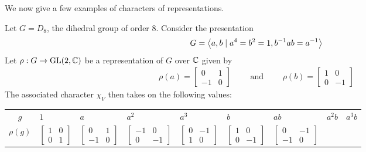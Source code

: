 We now give a few examples of characters of representations.

\begin{example}
    Let $G = D_8$, the dihedral group of order $8$. Consider the presentation
    \begin{align*}
        G = \left\langle a, b \mid a^4 = b^2 = 1, b^{-1} a b = a^{-1} \right\rangle
    \end{align*}
    Let $\rho : G \to \operatorname{GL}\!\left( 2, \mathbb{C} \right)$ be a representation of $G$ over $\mathbb{C}$ given by
    \begin{align*}
        \rho(a) = \begin{bmatrix}
            0 & 1 \\ -1 & 0
        \end{bmatrix}
        \quad\quad \text{ and } \quad\quad
        \rho(b) = \begin{bmatrix}
            1 & 0 \\ 0 & -1
        \end{bmatrix}
    \end{align*}
    The associated character $\chi_V$ then takes on the following values:
    \begin{table}[H]
        \centering
        \begin{tabular}{|c|C{1.2cm} C{1.55cm} C{1.85cm} C{1.55cm} C{1.55cm} C{1.85cm} C{1.55cm} C{1.2cm}|}
            \hline
            $g$ & $1$ & $a$ & $a^2$ & $a^3$ & $b$ & $ab$ & $a^2 b$ & $a^3 b$ \\
            $\rho(g)$ &
            $\begin{bmatrix} 1 & 0 \\ 0 & 1 \end{bmatrix}$
            &
            $\begin{bmatrix} 0 & 1 \\ -1 & 0 \end{bmatrix}$
            &
            $\begin{bmatrix} -1 & 0 \\ 0 & -1 \end{bmatrix}$
            &
            $\begin{bmatrix} 0 & -1 \\ 1 & 0 \end{bmatrix}$
            &
            $\begin{bmatrix} 1 & 0 \\ 0 & -1 \end{bmatrix}$
            &
            $\begin{bmatrix} 0 & -1 \\ -1 & 0 \end{bmatrix}$

\end{tabular}
\end{table}
\end{example}
